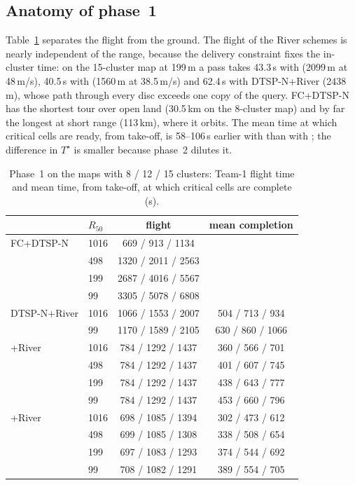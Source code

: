 \subsection{Anatomy of phase~1}
Table~\ref{tab:phase1} separates the flight from the ground. The flight of the River schemes is nearly independent of
the range, because the delivery constraint fixes the in-cluster time: on the 15-cluster map at 199\,m a pass takes 43.3\,s
with \chord{} (2099\,m at 48\,m/s), 40.5\,s with \lmtour{} (1560\,m at 38.5\,m/s) and 62.4\,s with DTSP-N+River (2438\,m),
whose path through every disc exceeds one copy of the query. FC+DTSP-N has the shortest tour over open land (30.5\,km on
the 8-cluster map) and by far the longest at short range (113\,km), where it orbits. The mean time at which critical
cells are ready, from take-off, is 58--106\,s earlier with \lmtour{} than with \chord{}; the difference in $T^\star$ is
smaller because phase~2 dilutes it.

\begin{table}[t]\centering
\caption{Phase~1 on the maps with 8 / 12 / 15 clusters: Team-1 flight time and mean time, from take-off, at which
critical cells are complete (s).}\label{tab:phase1}
\setlength{\tabcolsep}{2.5pt}\footnotesize
\begin{tabular}{llcc}\toprule
 & $R_{50}$ & flight & mean completion\\\midrule
FC+DTSP-N & 1016 & 669 / 913 / 1134 & \\
 & 498 & 1320 / 2011 / 2563 & \\
 & 199 & 2687 / 4016 / 5567 & \\
 & 99 & 3305 / 5078 / 6808 & \\\midrule
DTSP-N+River & 1016 & 1066 / 1553 / 2007 & 504 / 713 / 934\\
 & 99 & 1170 / 1589 / 2105 & 630 / 860 / 1066\\\midrule
\chord{}+River & 1016 & 784 / 1292 / 1437 & 360 / 566 / 701\\
 & 498 & 784 / 1292 / 1437 & 401 / 607 / 745\\
 & 199 & 784 / 1292 / 1437 & 438 / 643 / 777\\
 & 99 & 784 / 1292 / 1437 & 453 / 660 / 796\\\midrule
\lmtour{}+River & 1016 & 698 / 1085 / 1394 & 302 / 473 / 612\\
 & 498 & 699 / 1085 / 1308 & 338 / 508 / 654\\
 & 199 & 697 / 1083 / 1293 & 374 / 544 / 692\\
 & 99 & 708 / 1082 / 1291 & 389 / 554 / 705\\\bottomrule
\end{tabular}
\end{table}

